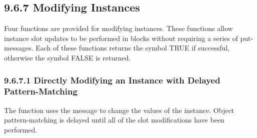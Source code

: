 \documentclass[letterpaper,10pt,english]{sphinxmanual}
\begin{document}
\begin{sphinxVerbatim}[commandchars=\\\{\}]
     
 
  \PYG{p}{[}\PYG{p}{]}
  \PYG{p}{[}\PYG{p}{]}
     
 
  \PYG{p}{[}\PYG{p}{]}
  \PYG{p}{[}\PYG{p}{]}
  \PYG{p}{[}\PYG{p}{]}
  \PYG{p}{[}\PYG{p}{]}
     
\end{sphinxVerbatim}


\subsection{9.6.7 Modifying Instances}
\label{\detokenize{cool:modifying-instances}}
Four functions are provided for modifying instances. These functions
allow instance slot updates to be performed in blocks without requiring
a series of put- messages. Each of these functions returns the symbol
TRUE if successful, otherwise the symbol FALSE is returned.


\subsubsection{9.6.7.1 Directly Modifying an Instance with Delayed Pattern-Matching}
\label{\detokenize{cool:directly-modifying-an-instance-with-delayed-pattern-matching}}
The  function uses the  message to
change the values of the instance. Object pattern-matching is delayed
until all of the slot modifications have been performed.


\begin{sphinxVerbatim}[commandchars=\\\{\}]
  
\end{sphinxVerbatim}
\end{document}
